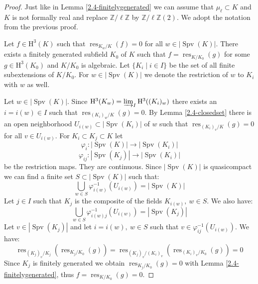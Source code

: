 \begin{proof}
Just like in Lemma \ref{2.4-finitelygenerated} we can assume that $\mu_\ell\subset K$ and $K$ is not formally real and replace $\mathbb{Z}/\ell\mathbb{Z}$ by $\mathbb{Z}/\ell\mathbb{Z}(2)$. We adopt the notation from the previous proof.

Let $f\in\mathrm{H}^3(K)$ such that $\operatorname{res}_{K_w/K}(f) = 0$ for all $w\in |\operatorname{Spv}(K)|$. There exists a finitely generated subfield $K_0$ of $K$ such that $f = \operatorname{res}_{K/K_0}(g)$ for some $g\in\mathrm{H}^3(K_0)$ and $K/K_0$ is algebraic. Let $\{K_i\mid i\in I\}$ be the set of all finite subextensions of $K/K_0$. For $w\in |\operatorname{Spv}(K)|$ we denote the restriction of $w$ to $K_i$ with $w$ as well.

Let  $w\in |\operatorname{Spv}(K)|$. Since $\mathrm{H}^3(K_w) = \varinjlim_I \mathrm{H}^3((K_i)_w)$ there exists an $i = i(w)\in I$ such that $\operatorname{res}_{(K_i)_w/K}(g) = 0$. By Lemma \ref{2.4-closedset} there is an open neighborhood $U_{i(w)}\subset |\operatorname{Spv}(K_i)|$ of $w$ such that $\operatorname{res}_{(K_i)_v/K}(g)=0$ for all $v\in U_{i(w)}$. For $K_i\subset K_j\subset K$ let
\[ \varphi_i: |\operatorname{Spv}(K)| \to |\operatorname{Spv}(K_i)| \]
\[ \varphi_{ij}: |\operatorname{Spv}(K_j)|\to |\operatorname{Spv}(K_i)| \]
be the restriction maps. They are continuous. Since $|\operatorname{Spv}(K)|$ is quasicompact we can find a finite set $S\subset |\operatorname{Spv}(K)|$ such that:
\[ \bigcup_{w\in S}\varphi^{-1}_{i(w)}(U_{i(w)}) = |\operatorname{Spv}(K)| \]
Let $j\in I$ such that $K_j$ is the composite of the fields $K_{i(w)},\ w\in S$. We also have:
\[ \bigcup_{w\in S}\varphi^{-1}_{i(w)j}(U_{i(w)}) = |\operatorname{Spv}(K_j)| \]
Let $v\in |\operatorname{Spv}(K_j)|$ and let $i = i(w),\ w\in S$ such that $v\in\varphi_{ij}^{-1}(U_{i(w)})$. We have:
\[ \operatorname{res}_{(K_j)_v/K_j}(\operatorname{res}_{K_j/K_0}(g)) = \operatorname{res}_{(K_j)_v/(K_i)_v}(\operatorname{res}_{(K_i)_v/K_0}(g)) = 0 \]
Since $K_j$ is finitely generated we obtain $\operatorname{res}_{K_j/K_0}(g) = 0$ with Lemma \ref{2.4-finitelygenerated}, thus $f = \operatorname{res}_{K/K_0}(g) = 0$.
\end{proof}

